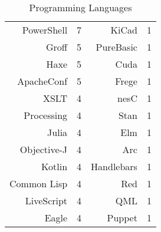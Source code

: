 \documentclass[12pt,oneside,final]{vlsithesis}
\begin{document}
\begin{table*}
\begin{tabular}{rr|rr}
		PowerShell&7&KiCad&1 \\  
		Groff&5&PureBasic&1 \\  
		Haxe&5&Cuda&1 \\  
		ApacheConf&5&Frege&1 \\  
		XSLT&4&nesC&1 \\  
		Processing&4&Stan&1 \\  
		Julia&4&Elm&1 \\  
		Objective-J&4&Arc&1 \\  
		Kotlin&4&Handlebars&1 \\  
		Common Lisp&4&Red&1 \\  
		LiveScript&4&QML&1 \\  
		Eagle&4&Puppet&1 \\ \bottomrule
	\end{tabular}
	\caption{Programming Languages}
	\label{tab:programming languages}
\end{table*}

\end{document}
